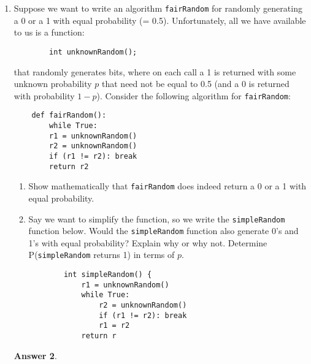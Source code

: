 \documentclass[12pt]{article}
\renewcommand{\(}{\left(}
\renewcommand{\)}{\right)}
\theoremstyle{definition}
\newtheorem*{answer}{Answer}
\begin{document}
\begin{enumerate}
\begin{shaded}
\begin{answer}
    \end{answer}
    \end{shaded}
    \pagebreak
    \textbf{Program Analysis}
    \item Suppose we want to write an algorithm \texttt{fairRandom} for randomly generating a 0 or a 1 with equal probability (= 0.5). Unfortunately, all we have available to us is a function:
    \begin{verbatim}
        int unknownRandom();
    \end{verbatim}
    that randomly generates bits, where on each call a 1 is returned with some unknown probability $p$ that need not be equal to 0.5 (and a 0 is returned with probability $1-p$). Consider the following algorithm for \texttt{fairRandom}:
    \begin{verbatim}
    def fairRandom():
        while True:
        r1 = unknownRandom()
        r2 = unknownRandom()
        if (r1 != r2): break
        return r2
    \end{verbatim}
    \begin{enumerate}
        \item Show mathematically that \texttt{fairRandom} does indeed return a 0 or a 1 with equal probability.
        \item Say we want to simplify the function, so we write the \texttt{simpleRandom} function below. Would the \texttt{simpleRandom} function also generate 0's and 1's with equal probability? Explain why or why not. Determine P(\texttt{simpleRandom} returns 1) in terms of $p$.
        \begin{verbatim}
        int simpleRandom() {
            r1 = unknownRandom()
            while True:
                r2 = unknownRandom()
                if (r1 != r2): break
                r1 = r2
            return r
        \end{verbatim}
    \end{enumerate}

    \begin{shaded}
    \begin{answer}
    

\end{answer}
\end{shaded}
\end{enumerate}
\end{document}
